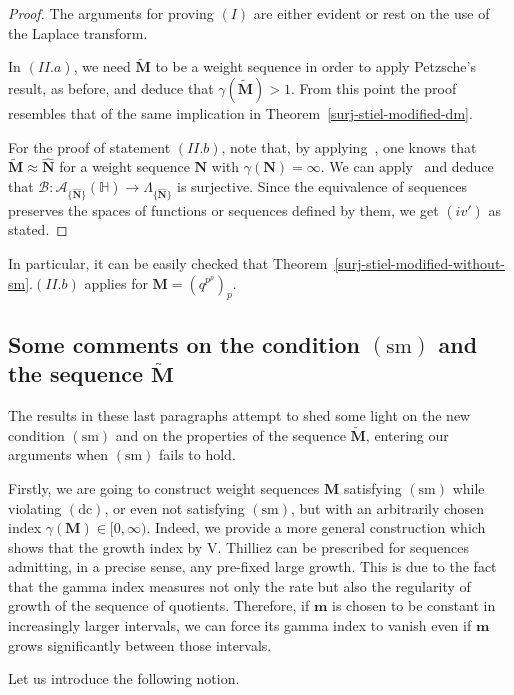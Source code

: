 \documentclass[12pt,a4paper]{article}
\newcommand{\HH}{\mathbb{H}}
\newcommand{\M}{{\boldsymbol{M}}}
\newcommand{\m}{{\boldsymbol{m}}}
\newcommand{\NN}{{\boldsymbol{N}}}
\newcommand{\hNN}{\widehat{{\boldsymbol{N}}}}
\newcommand{\dc}{\operatorname{(dc)}}
\newcommand{\sm}{\operatorname{(sm)}}
\newcommand{\ga}{\gamma}
\theoremstyle{plain}
\theoremstyle{definition}
\numberwithin{equation}{section}
\begin{document}
\begin{proof}
The arguments for proving $(I)$ are either evident or rest on the use of the Laplace transform.\par
In $(II.a)$, we need $\widetilde{\M}$ to be a weight sequence in order to apply Petzsche's result, as before, and deduce that $\gamma(\widetilde{\M})>1$. From this point the proof resembles that of the same implication in Theorem~\ref{surj-stiel-modified-dm}.\par
For the proof of statement $(II.b)$, note that, by applying~\cite[Corollary 3.12 and Remark 3.15]{JimenezSanzSchindlIndex}, one knows that $\widetilde{\M}\approx\hNN$ for a weight sequence $\NN$ with $\ga(\NN)=\infty$. We can apply~\cite[Thm. 4.5]{JimenezSanzSchindlSurjectDC} and deduce that $\mathcal{B}: \mathcal{A}_{\{\hNN\}}(\HH) \rightarrow \Lambda_{\{\hNN\}}$ is surjective. Since the equivalence of sequences preserves the spaces of functions or sequences defined by them, we get $(iv')$ as stated.
\end{proof}

\noindent In particular, it can be easily checked that Theorem~\ref{surj-stiel-modified-without-sm}.$(II.b)$ applies for $\M=(q^{p^p})_p$.

\subsection{Some comments on the condition $\sm$ and the sequence $\widetilde{\M}$}\label{subsect.commentsMtilde}

The results in these last paragraphs attempt to shed some light on the new condition $\sm$ and on the properties of the sequence $\widetilde{\M}$, entering our arguments when $\sm$ fails to hold.

Firstly, we are going to construct weight sequences $\M$ satisfying $\sm$ while violating $\dc$, or even not satisfying $\sm$, but with an arbitrarily chosen index $\gamma(\M)\in[0,\infty)$. Indeed, we provide a more general construction which shows that the growth index by V. Thilliez can be prescribed for sequences admitting, in a precise sense, any pre-fixed large growth. This is due to the fact that the gamma index measures not only the rate but also the regularity of growth of the sequence of quotients. Therefore, if $\m$ is chosen to be constant in increasingly larger intervals, we can force its gamma index to vanish even if $\m$ grows significantly between those intervals.

Let us introduce the following notion.
\end{document}
